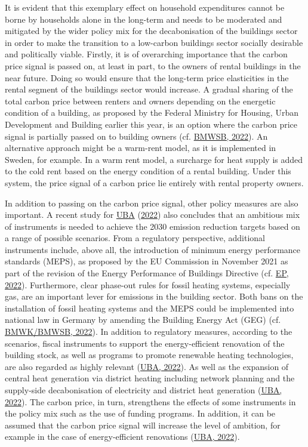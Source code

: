 \documentclass[12pt,twoside]{reedthesis}
\begin{document}
It is evident that this exemplary effect on household expenditures cannot be borne by households alone in the long-term and needs to be moderated and mitigated by the wider policy mix for the decabonisation of the buildings sector in order to make the transition to a low-carbon buildings sector socially desirable and politically viable. Firstly, it is of overarching importance that the carbon price signal is passed on, at least in part, to the owners of rental buildings in the near future. Doing so would ensure that the long-term price elasticities in the rental segment of the buildings sector would increase. A gradual sharing of the total carbon price between renters and owners depending on the energetic condition of a building, as proposed by the Federal Ministry for Housing, Urban Development and Building earlier this year, is an option where the carbon price signal is partially passed on to building owners (cf. \protect\hyperlink{ref-bmwsb22}{BMWSB, 2022}). An alternative approach might be a warm-rent model, as it is implemented in Sweden, for example. In a warm rent model, a surcharge for heat supply is added to the cold rent based on the energy condition of a rental building. Under this system, the price signal of a carbon price lie entirely with rental property owners.

In addition to passing on the carbon price signal, other policy measures are also important. A recent study for \protect\hyperlink{ref-uba22}{UBA} (\protect\hyperlink{ref-uba22}{2022}) also concludes that an ambitious mix of instruments is needed to achieve the 2030 emission reduction targets based on a range of possible scenarios. From a regulatory perspective, additional instruments include, above all, the introduction of minimum energy performance standards (MEPS), as proposed by the EU Commission in November 2021 as part of the revision of the Energy Performance of Buildings Directive (cf. \protect\hyperlink{ref-ep22}{EP, 2022}). Furthermore, clear phase-out rules for fossil heating systems, especially gas, are an important lever for emissions in the building sector. Both bans on the installation of fossil heating systems and the MEPS could be implemented into national law in Germany by amending the Building Energy Act (GEG) (cf. \protect\hyperlink{ref-bmwkux2fbmwsb22}{BMWK/BMWSB, 2022}). In addition to regulatory measures, according to the scenarios, fiscal instruments to support the energy-efficient renovation of the building stock, as well as programs to promote renewable heating technologies, are also regarded as highly relevant (\protect\hyperlink{ref-uba22}{UBA, 2022}). As well as the expansion of central heat generation via district heating including network planning and the supply-side decabonisation of electricity and district heat generation (\protect\hyperlink{ref-uba22}{UBA, 2022}). The carbon price, in turn, strengthens the effects of some instruments in the policy mix such as the use of funding programs. In addition, it can be assumed that the carbon price signal will increase the level of ambition, for example in the case of energy-efficient renovations (\protect\hyperlink{ref-uba22}{UBA, 2022}).
\end{document}
